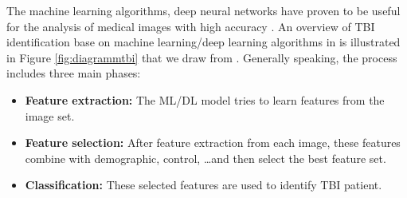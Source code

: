 \documentclass[runningheads]{llncs}
\begin{document}
The machine learning algorithms, deep neural networks have proven to be useful for the analysis of medical images with high accuracy \cite{litjens2017survey}. An overview of TBI identification base on machine learning/deep learning algorithms in \cite{lui_classification_2014,zador_predictors_2016,vergara_dynamic_2018,minaee_mtbi_2019} is illustrated in Figure \ref{fig:diagrammtbi} that we draw from \cite{lui_classification_2014,zador_predictors_2016,vergara_dynamic_2018,minaee_mtbi_2019}. Generally speaking, the process includes three main phases:
\begin{itemize}
    \item \textbf{Feature extraction:} The ML/DL model tries to learn features from the image set.
    \item \textbf{Feature selection:} After feature extraction from each image, these features combine with demographic, control, \dots and then select the best feature set.
    \item \textbf{Classification:} These selected features are used to identify TBI patient.
\end{itemize}
\end{document}
